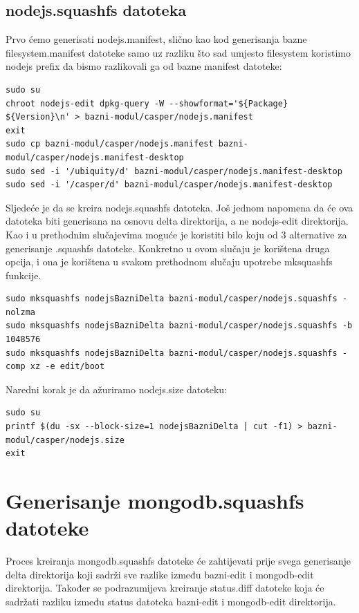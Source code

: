 \documentclass[12pt,vi]{mitthesis}
\begin{document}
\subsection*{nodejs.squashfs datoteka}
\indent
Prvo ćemo generisati nodejs.manifest, slično kao kod generisanja bazne filesystem.manifest datoteke samo uz razliku što sad umjesto filesystem koristimo nodejs prefix da bismo razlikovali ga od bazne manifest datoteke:
\begin{lstlisting}[style=BashInputStyle]
sudo su
chroot nodejs-edit dpkg-query -W --showformat='${Package} ${Version}\n' > bazni-modul/casper/nodejs.manifest
exit
sudo cp bazni-modul/casper/nodejs.manifest bazni-modul/casper/nodejs.manifest-desktop
sudo sed -i '/ubiquity/d' bazni-modul/casper/nodejs.manifest-desktop
sudo sed -i '/casper/d' bazni-modul/casper/nodejs.manifest-desktop
\end{lstlisting}
\indent
Sljedeće je da se kreira nodejs.squashfs datoteka. Još jednom napomena da će ova datoteka biti generisana na osnovu delta direktorija, a ne nodejs-edit direktorija. Kao i u prethodnim slučajevima moguće je koristiti bilo koju od 3 alternative za generisanje .squashfs datoteke. Konkretno u ovom slučaju je korištena druga opcija, i ona je korištena u svakom prethodnom slučaju upotrebe mksquashfs funkcije.
\begin{lstlisting}[style=BashInputStyle]
sudo mksquashfs nodejsBazniDelta bazni-modul/casper/nodejs.squashfs -nolzma 
sudo mksquashfs nodejsBazniDelta bazni-modul/casper/nodejs.squashfs -b 1048576
sudo mksquashfs nodejsBazniDelta bazni-modul/casper/nodejs.squashfs -comp xz -e edit/boot
\end{lstlisting}

\noindent
Naredni korak je da ažuriramo nodejs.size datoteku:
\begin{lstlisting}[style=BashInputStyle]
sudo su
printf $(du -sx --block-size=1 nodejsBazniDelta | cut -f1) > bazni-modul/casper/nodejs.size
exit
\end{lstlisting}

\section*{Generisanje mongodb.squashfs datoteke}
\indent
Proces kreiranja mongodb.squashfs datoteke će zahtijevati prije svega generisanje delta direktorija koji sadrži sve razlike između bazni-edit i mongodb-edit direktorija. Također se podrazumijeva kreiranje status.diff datoteke koja će sadržati razliku između status datoteka bazni-edit i mongodb-edit direktorija.\\
\end{document}
